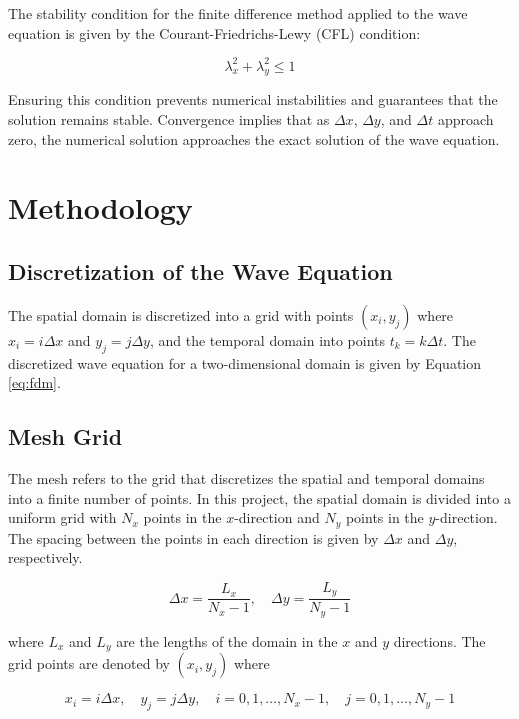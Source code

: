 \documentclass{article}
\begin{document}
The stability condition for the finite difference method applied to the wave equation is given by the Courant-Friedrichs-Lewy (CFL) condition:

\begin{equation}
    \lambda_x^2 + \lambda_y^2 \leq 1
\end{equation}

Ensuring this condition prevents numerical instabilities and guarantees that the solution remains stable. Convergence implies that as \(\Delta x\), \(\Delta y\), and \(\Delta t\) approach zero, the numerical solution approaches the exact solution of the wave equation.

\section{Methodology}

\subsection{Discretization of the Wave Equation}

The spatial domain is discretized into a grid with points \((x_i, y_j)\) where
\(x_i = i \Delta x\) and \(y_j = j \Delta y\), and the temporal domain into
points \(t_k = k \Delta t\). The discretized wave equation for a
two-dimensional domain is given by Equation \ref{eq:fdm}.
\cite{burden1993numerical}

\subsection{Mesh Grid}

The mesh refers to the grid that discretizes the spatial and temporal domains
into a finite number of points. In this project, the spatial domain is divided
into a uniform grid with \(N_x\) points in the \(x\)-direction and \(N_y\)
points in the \(y\)-direction. The spacing between the points in each direction
is given by \(\Delta x\) and \(\Delta y\), respectively.
\cite{burden1993numerical}

\[
\Delta x = \frac{L_x}{N_x-1}, \quad \Delta y = \frac{L_y}{N_y-1}
\]

where \(L_x\) and \(L_y\) are the lengths of the domain in the \(x\) and \(y\) directions. The grid points are denoted by \((x_i, y_j)\) where

\[
x_i = i \Delta x, \quad y_j = j \Delta y, \quad i = 0, 1, \ldots, N_x-1, \quad j = 0, 1, \ldots, N_y-1
\]
\end{document}
